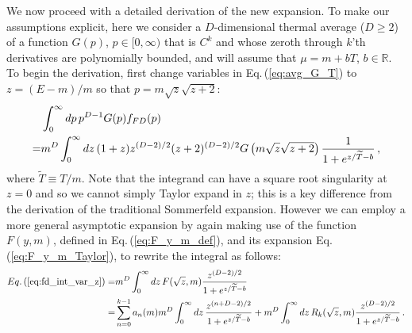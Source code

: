 \documentclass[sn-mathphys,Numbered]{sn-jnl}
\newcommand{\req}[1]{Eq.\,(\ref{#1})}
\begin{document}
We now proceed with a detailed derivation of the new expansion. To make our assumptions explicit, here we consider a $D$-dimensional thermal average ($D\geq 2$) of a function $G(p)$, $p\in[0,\infty)$ that is $C^k$ and whose zeroth through $k$'th derivatives are polynomially bounded, and will assume that $\mu=m+bT$, $b\in\mathbb{R}$. To begin the derivation, first change variables in \req{eq:avg_G_T} to $z=(E-m)/m$ so that $p=m\sqrt{z}\sqrt{z+2}$:
\begin{align}
&\int_0^\infty dp\, p^{D-1} G(p) f_{FD}(p)\notag\\
=&m^{D}\int_0^\infty dz\, (1+z) z^{(D-2)/2} (z+2)^{(D-2)/2} G\left(m\sqrt{z}\sqrt{z+2}\right) \frac{1}{1+e^{z/\widetilde{T}-b}}\,,\label{eq:fd_int_var_z}
\end{align}
where $\widetilde{T}\equiv T/m$. Note that the integrand can have a square root singularity at $z=0$ and so we cannot simply Taylor expand in $z$; this is a key difference from the derivation of the traditional Sommerfeld expansion. However we can employ a more general asymptotic expansion by again making use of the function $F(y,m)$, defined in \req{eq:F_y_m_def}, and its expansion \req{eq:F_y_m_Taylor}, to rewrite the integral as follows:
\begin{align}
 \req{eq:fd_int_var_z}=&m^{D}\int_0^\infty dz\, F(\sqrt{z},m)\frac{z^{(D-2)/2}}{1+e^{z/\widetilde{T}-b}}\\
 =&\sum_{n=0}^{k-1} a_n(m)m^{D}\int_0^\infty dz\, \frac{z^{(n+D-2)/2}}{1+e^{z/\widetilde{T}-b}}+m^{D}\int_0^\infty dz\, R_k(\sqrt{z},m)\frac{z^{(D-2)/2}}{1+e^{z/\widetilde{T}-b}}\,.\notag
\end{align}
\end{document}
